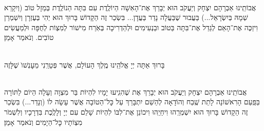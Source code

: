 \documentclass[twoside, openany, parskip=half, 11pt]{book}
\begin{document}
\begin{small}
\\
אֲבוֹתֵֽינוּ אַבְרָהָם יִצְחָק וְיַעֲקֹב הוּא יְבָרֵךְ אֶת־הָאִשָׁה הַיוֹלֶֽדֶת
עִם בִּתָּה הַנוֹלֶֽדֶת בְּמַזָל טוֹב (וְיִקָרֵא שְׁמָהּ בְּיִשְׂרָאֵל...) בַּעֲבוּר שֶׁבַּעֲלָה נָדַר בַּעֲדָן... בִּשְׂכַר זֶה הַקָדוֹשׁ בָּרוּךְ הוּא יְהִי בְּעֶזְרָן וְיִשְׁמְרֵן וִיזַכֶּה אֶת־הָאֵם לְגַדֵל אֶת־בִּתָּה בַּטוֹב ובַנְעִימִים וּלְהַדְרִיכָה בְּאֹֽרַח מִישׁוֹר לְמִצְוֹת לְחֻפָּה וּלְמַעֲשִׂים טוֹבִים. וְנֹאמַר אָמֵן׃


\\
בָּרוּךְ אַתָּה יְיָ אֱלֹהֵֽינוּ מֶֽלֶךְ הָעוֹלָם, אֲשֶׁר פְּטָרַֽנִי מֵעׇנְשׁוׂ שֶׁלָּזֶה

\\
אֲבוֹתֵֽינוּ אַבְרָהָם יִצְחָק וְיַעֲקֹב הוּא יְבָרֵךְ אֶת
שֶׁהִגִֽיעוּ יָמָיו לִהְיוֹת בַּר מִצְוָה וְעָלָה הַיוֹם לַתּוֹרָה בַּפַּֽעַם הָרִאשׁוֹנָה לָתֵת שֶֽׁבַח וְהוֹדָאָה לְהַשֵׁם יִתְבָּרַךְ עַל כׇּל־הַטוֹבָה אֲשֶׁר עָשָׂה לוֹ (וְנָדַר...) בִּשְׂכַר זֶה הַקָדוֹשׁ בָּרוּךְ הוּא יִשְׁמְרֵֽהוּ וִיחַיֵֽהוּ וִיכוֹנֵן אֶת־לִבּוֹ לִהְיוֹת שָׁלֵם עִם יְיָ וְלָלֶֽכֶת בִּדְרָכָיו וְלִשְׁמֹר מִצְוֹתָיו כׇּל־הַיָמִים וְנֹאמַר אָמֵן׃


\end{small}

\sepline

\\
\halfkaddish


\newcommand{\hagbaha}{
\instruction{הגבה:}
\firstword{וְזֹ֖את הַתּוֹרָ֑ה}\source{דברים ד}
אֲשֶׁר־שָׂ֣ם מֹשֶׁ֔ה לִפְנֵ֖י בְּנֵ֥י יִשְׂרָאֵֽל׃
עַל־פִּ֥י \source{במדבר ט}יְיָ֖ בְּיַד־מֹשֶֽׁה׃
עֵץ־חַיִּ֣ים \source{משלי ג} הִ֭יא לַמַּחֲזִיקִ֣ים בָּ֑הּ וְֽתֹמְכֶ֥יהָ מְאֻשָּֽׁר׃
דְּרָכֶ֥יהָ דַרְכֵי־נֹ֑עַם וְֽכׇל־נְתִ֖יבוֹתֶ֣יהָ שָׁלֽוֹם׃
אֹ֣רֶךְ יָ֭מִים בִּֽימִינָ֑הּ בִּ֝שְׂמֹאולָ֗הּ עֹ֣שֶׁר וְכָבֽוֹד׃
יְיָ֥ \source{ישעיה מב}חָפֵ֖ץ לְמַ֣עַן צִדְק֑וֹ יַגְדִּ֥יל תּוֹרָ֖ה וְיַאְדִּֽיר׃

}


\newcommand{\yehalelu}{
\shatz
\begin{large}
\textbf{יְהַלְל֤וּ ׀ אֶת־שֵׁ֬ם יְיָ֗ כִּֽי־נִשְׂגָּ֣ב שְׁמ֣וֹ לְבַדּ֑וֹ}\source{תהלים קמח}
\end{large}

\kahal
ה֝וֹד֗וֹ עַל־אֶ֥רֶץ וְשָׁמָֽיִם׃ וַיָּ֤רֶם קֶ֨רֶן ׀ לְעַמּ֡וֹ תְּהִלָּ֤ה לְֽכׇל־חֲסִידָ֗יו לִבְנֵ֣י יִ֭שְׂרָאֵל עַ֥ם קְרֹב֗וֹ הַֽלְלוּ־יָֽהּ׃
}
\end{document}
